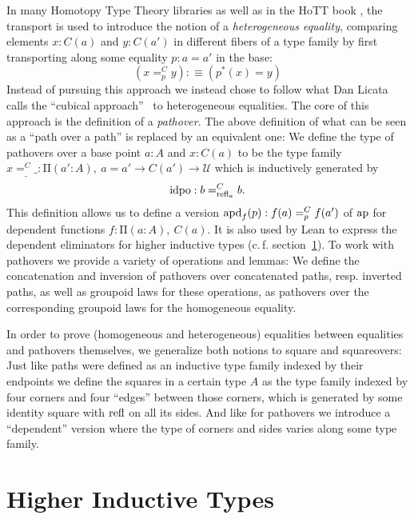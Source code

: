 \documentclass{llncs}
\newcommand{\fa}[2]{\ensuremath{\mathrm{\Pi}(#1),\ #2}}
\newcommand{\myap}{\textnormal{ap}}
\newcommand{\myapd}{\textnormal{apd}}
\newcommand{\refl}{\textnormal{refl}}
\newcommand{\idpo}{\textnormal{idpo}}
\newcommand{\UU}{\mathcal{U}}
\begin{document}
In many Homotopy Type Theory libraries as well as in the HoTT book \cite{hottbook},
the transport is used to introduce the notion of a \emph{heterogeneous equality},
comparing elements $x : C(a)$ and $y : C(a')$ in different fibers of a type family
by first transporting along some equality $p : a = a'$ in the base:
$$
\left(x =_p^C y\right) :\equiv \left(p^*(x) = y\right)
$$
Instead of pursuing this approach we instead chose to follow what Dan Licata calls
the ``cubical approach''~\cite{LicataBrunerie2015} to heterogeneous equalities.
The core of this approach is the definition of a \emph{pathover}.
The above definition of what can be seen as a ``path over a path'' is replaced by
an equivalent one:
We define the type of pathovers over a base point $a : A$ and $x : C(a)$ to be the
type family $x =_\_^C \_ : \fa{a' : A}{a = a' \to C(a') \to \UU}$ which is inductively generated
by
$$
\idpo : b =_{\refl_a}^C b \textnormal{.}
$$
This definition allows us to define a version $\myapd_f(p) : f(a) =_p^C f(a')$ of
$\myap$ for dependent functions $f : \fa{a : A}{C(a)}$.
It is also used by Lean to express the dependent eliminators for higher inductive
types (c.\,f. section~\ref{sec:hits}).
To work with pathovers we provide a variety of operations and lemmas:
We define the concatenation and inversion of pathovers over concatenated paths,
resp. inverted paths, as well as groupoid laws for these operations, as pathovers
over the corresponding groupoid laws for the homogeneous equality. %

In order to prove (homogeneous and heterogeneous) equalities between equalities
and pathovers themselves, we generalize both notions to square and squareovers:
Just like paths were defined as an inductive type family indexed by their endpoints
we define the squares in a certain type $A$ as the type family indexed by four corners
and four ``edges'' between those corners, which is generated by some identity
square with $\refl$ on all its sides.
And like for pathovers we introduce a ``dependent'' version where the type of
corners and sides varies along some type family.


\section{Higher Inductive Types}
\label{sec:hits}
\end{document}
